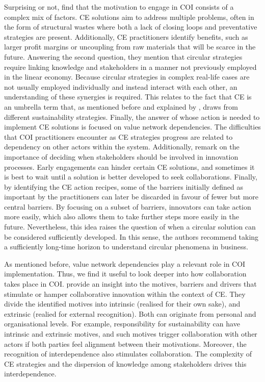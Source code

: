 Surprising or not, \citeauthor{blomsma2022making} find that the motivation to engage in COI consists of a complex mix of factors. CE solutions aim to address multiple problems, often in the form of structural wastes where both a lack of closing loops and preventative strategies are present. Additionally, CE practitioners identify benefits, such as larger profit margins or uncoupling from raw materials that will be scarce in the future. Answering the second question, they mention that circular strategies require linking knowledge and stakeholders in a manner not previously employed in the linear economy. Because circular strategies in complex real-life cases are not usually employed individually and instead interact with each other, an understanding of these synergies is required. This relates to the fact that CE is an umbrella term that, as mentioned before and explained by \cite{kalmykova2018circular}, draws from different sustainability strategies. Finally, the answer of whose action is needed to implement CE solutions is focused on value network dependencies. The difficulties that COI practitioners encounter as CE strategies progress are related to dependency on other actors within the system. Additionally, \cite{blomsma2022making} remark on the importance of deciding when stakeholders should be involved in innovation processes. Early engagements can hinder certain CE solutions, and sometimes it is best to wait until a solution is better developed to seek collaborations. Finally, by identifying the CE action recipes, some of the barriers initially defined as important by the practitioners can later be discarded in favour of fewer but more central barriers. By focusing on a subset of barriers, innovators can take action more easily, which also allows them to take further steps more easily in the future. Nevertheless, this idea raises the question of when a circular solution can be considered sufficiently developed. In this sense, the authors recommend taking a sufficiently long-time horizon to understand circular phenomena in business. 

As mentioned before, value network dependencies play a relevant role in COI implementation. Thus, we find it useful to look deeper into how collaboration takes place in COI. \cite{brown2019companies} provide an insight into the motives, barriers and drivers that stimulate or hamper collaborative innovation within the context of CE. They divide the identified motives into intrinsic (realised for their own sake), and extrinsic (realied for external recognition).
Both can originate from personal and organisational levels. For example, responsibility for sustainability can have intrinsic and extrinsic motives, and such motives trigger collaboration with other actors if both parties feel alignment between their motivations. Moreover, the recognition of interdependence also stimulates collaboration. The complexity of CE strategies and the dispersion of knowledge among stakeholders drives this interdependence. 

